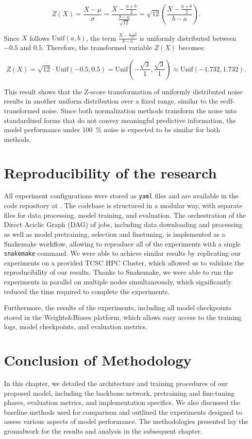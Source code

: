 \[
    Z(X) = \frac{X - \mu}{\sigma} = \frac{X - \frac{a + b}{2}}{\frac{b - a}{\sqrt{12}}} = \sqrt{12} \left( \frac{X - \frac{a + b}{2}}{b - a} \right).
\]

Since \( X \) follows \( \text{Unif}(a, b) \), the term \( \frac{X - \frac{a + b}{2}}{b - a} \) is uniformly distributed between \(-0.5\) and \(0.5\). Therefore, the transformed variable \( Z(X) \) becomes:

\begin{equation}
    \label{eq:uniform_z_range}
    Z(X) = \sqrt{12} \cdot \text{Unif}(-0.5, 0.5) = \text{Unif}\left( -\frac{\sqrt{3}}{1}, \frac{\sqrt{3}}{1} \right) \approx \text{Unif}(-1.732, 1.732).
\end{equation}

This result shows that the Z-score transformation of uniformly distributed noise results in another uniform distribution over a fixed range, similar to the \gls{ecdf}-transformed noise. Since both normalization methods transform the noise into standardized forms that do not convey meaningful predictive information, the model performance under \qty{100}{\percent} noise is expected to be similar for both methods.


\section{Reproducibility of the research}

All experiment configurations were stored as \texttt{yaml} files and are available in the code repository at . The codebase is structured in a modular way, with separate files for data processing, model training, and evaluation. The orchestration of the Direct Aciclic Graph (DAG) of jobs, including data downloading and processing as well as model pretraining, selection and finetuning, is implemented as a Snakemake workflow, allowing to reproduce all of the experiments with a single \texttt{snakemake} command. We were able to achieve similar results by replicating our experiments on a provided TCSC HPC Cluster, which allowed us to validate the reproducibility of our results. Thanks to Snakemake, we were able to run the experiments in parallel on multiple nodes simultaneously, which significantly reduced the time required to complete the experiments.

Furthermore, the results of the experiments, including all model checkpoints stored in the Weights\&Biases platform, which allows easy access to the training logs, model checkpoints, and evaluation metrics.


\section{Conclusion of Methodology}

In this chapter, we detailed the architecture and training procedures of our proposed model, including the backbone network, pretraining and fine-tuning phases, evaluation metrics, and implementation specifics. We also discussed the baseline methods used for comparison and outlined the experiments designed to assess various aspects of model performance. The methodologies presented lay the groundwork for the results and analysis in the subsequent chapter.

